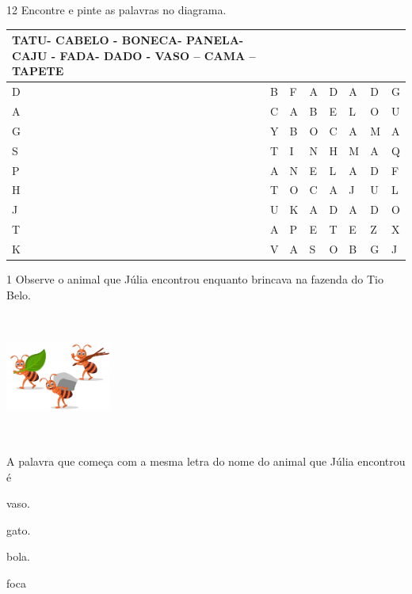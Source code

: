 \num{12} Encontre e pinte as palavras no diagrama.


\begin{longtable}[]{@{}llllllll@{}}
\toprule
TATU- CABELO - BONECA- PANELA- CAJU - FADA- DADO - VASO -- CAMA --
TAPETE\tabularnewline
\midrule
\endhead
D & B & F & A & D & A & D & G\tabularnewline
A & C & A & B & E & L & O & U\tabularnewline
G & Y & B & O & C & A & M & A\tabularnewline
S & T & I & N & H & M & A & Q\tabularnewline
P & A & N & E & L & A & D & F\tabularnewline
H & T & O & C & A & J & U & L\tabularnewline
J & U & K & A & D & A & D & O\tabularnewline
T & A & P & E & T & E & Z & X\tabularnewline
K & V & A & S & O & B & G & J\tabularnewline
\bottomrule
\end{longtable}


\num{1} Observe o animal que Júlia encontrou enquanto brincava na 
fazenda do Tio Belo.

\includegraphics[width=1.36528in,height=1.64861in]{media/image42.jpeg}


A palavra que começa com a mesma letra do nome do animal que Júlia
encontrou é

\begin{minipage}{.5\textwidth}
\begin{escolha}
\item vaso.

\item gato.

\item bola.

\item foca
\end{escolha}
\end{minipage}

